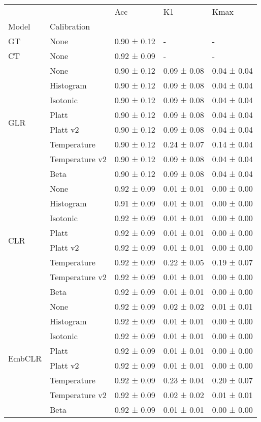 \begin{tabular}{lllll}
\toprule
 &  & Acc & K1 & Kmax \\
Model & Calibration &  &  &  \\
\midrule
GT & None & 0.90 ± 0.12 & - & - \\
\cline{1-5}
CT & None & 0.92 ± 0.09 & - & - \\
\cline{1-5}
\multirow[t]{8}{*}{GLR} & None & 0.90 ± 0.12 & 0.09 ± 0.08 & 0.04 ± 0.04 \\
 & Histogram & 0.90 ± 0.12 & 0.09 ± 0.08 & 0.04 ± 0.04 \\
 & Isotonic & 0.90 ± 0.12 & 0.09 ± 0.08 & 0.04 ± 0.04 \\
 & Platt & 0.90 ± 0.12 & 0.09 ± 0.08 & 0.04 ± 0.04 \\
 & Platt v2 & 0.90 ± 0.12 & 0.09 ± 0.08 & 0.04 ± 0.04 \\
 & Temperature & 0.90 ± 0.12 & 0.24 ± 0.07 & 0.14 ± 0.04 \\
 & Temperature v2 & 0.90 ± 0.12 & 0.09 ± 0.08 & 0.04 ± 0.04 \\
 & Beta & 0.90 ± 0.12 & 0.09 ± 0.08 & 0.04 ± 0.04 \\
\cline{1-5}
\multirow[t]{8}{*}{CLR} & None & 0.92 ± 0.09 & 0.01 ± 0.01 & 0.00 ± 0.00 \\
 & Histogram & 0.91 ± 0.09 & 0.01 ± 0.01 & 0.00 ± 0.00 \\
 & Isotonic & 0.92 ± 0.09 & 0.01 ± 0.01 & 0.00 ± 0.00 \\
 & Platt & 0.92 ± 0.09 & 0.01 ± 0.01 & 0.00 ± 0.00 \\
 & Platt v2 & 0.92 ± 0.09 & 0.01 ± 0.01 & 0.00 ± 0.00 \\
 & Temperature & 0.92 ± 0.09 & 0.22 ± 0.05 & 0.19 ± 0.07 \\
 & Temperature v2 & 0.92 ± 0.09 & 0.01 ± 0.01 & 0.00 ± 0.00 \\
 & Beta & 0.92 ± 0.09 & 0.01 ± 0.01 & 0.00 ± 0.00 \\
\cline{1-5}
\multirow[t]{8}{*}{EmbCLR} & None & 0.92 ± 0.09 & 0.02 ± 0.02 & 0.01 ± 0.01 \\
 & Histogram & 0.92 ± 0.09 & 0.01 ± 0.01 & 0.00 ± 0.00 \\
 & Isotonic & 0.92 ± 0.09 & 0.01 ± 0.01 & 0.00 ± 0.00 \\
 & Platt & 0.92 ± 0.09 & 0.01 ± 0.01 & 0.00 ± 0.00 \\
 & Platt v2 & 0.92 ± 0.09 & 0.01 ± 0.01 & 0.00 ± 0.00 \\
 & Temperature & 0.92 ± 0.09 & 0.23 ± 0.04 & 0.20 ± 0.07 \\
 & Temperature v2 & 0.92 ± 0.09 & 0.02 ± 0.02 & 0.01 ± 0.01 \\
 & Beta & 0.92 ± 0.09 & 0.01 ± 0.01 & 0.00 ± 0.00 \\
\cline{1-5}
\bottomrule
\end{tabular}
